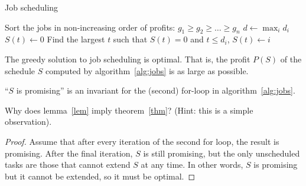 \documentclass{article}
\newenvironment{thm}[1]
	{\renewcommand\theinnerthm{#1}\innerthm}
	{\endinnerthm}
\newenvironment{lem}[1]
	{\renewcommand\theinnerlem{#1}\innerlem}
	{\endinnerlem}
\newenvironment{prb}[1]
	{\renewcommand\theinnerprb{#1}\innerprb}
	{\endinnerprb}
\begin{document}
\begin{algorithm}
\caption{Job scheduling}%
\label{alg:jobs}%
\begin{algorithmic}[1]
\STATE Sort the jobs in non-increasing order of profits:
  $g_1\geq g_2\geq\ldots\geq g_n$ 
\STATE $d\longleftarrow\max_id_i$ 
     \STATE $S(t)\longleftarrow 0$ 
\ENDFOR
{} 
     \STATE Find the largest $t$ such that $S(t)=0$ and $t\leq d_i$,
            $S(t)\longleftarrow i$
\ENDFOR
\end{algorithmic}
\end{algorithm}

\begin{thm}{2.18}\label{thm}
The greedy solution to job scheduling is optimal. That is, the profit $P(S)$ of the schedule $S$ computed
by algorithm~\ref{alg:jobs} is as large as possible.
\end{thm}

\begin{lem}{2.19}\label{lem}
``$S$ is promising'' is an invariant for the (second) for-loop
in algorithm~\ref{alg:jobs}.   
\end{lem}

\begin{prb}{2.21}
Why does lemma~\ref{lem} imply theorem~\ref{thm}?
(Hint: this is a simple observation). 
\end{prb}

\begin{proof}
Assume that after every iteration of the second for loop, the 
result is promising. After the final iteration, $S$ is still
promising, but the only unscheduled tasks are those that 
cannot extend $S$ at any time. In other words, $S$ is 
promising but it cannot be extended, so it must be optimal.
\end{proof}
\end{document}

